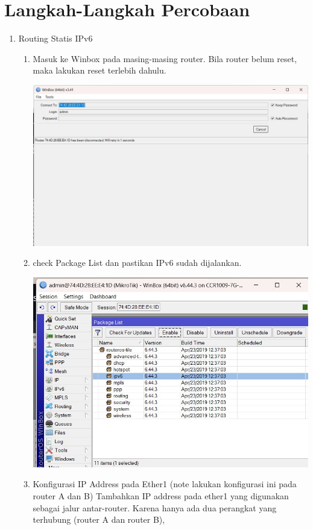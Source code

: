 \section{Langkah-Langkah Percobaan}
\begin{enumerate}
    \item Routing Statis IPv6
    \begin{enumerate}
        \item Masuk ke Winbox pada masing-masing router. Bila 
        router belum reset, maka lakukan reset terlebih dahulu.

        \includegraphics[scale=0.2]{P1/img/1.jpg}

        \item check Package List dan pastikan IPv6 sudah dijalankan.
        
        \includegraphics[scale=0.4]{P1/img/3.jpg}

        \item Konfigurasi IP Address pada Ether1 (note lakukan 
        konfigurasi ini pada router A dan B) Tambahkan IP 
        address pada ether1 yang digunakan sebagai jalur 
        antar-router. Karena hanya ada dua perangkat yang terhubung 
        (router A dan router B),


\end{enumerate}
\end{enumerate}
